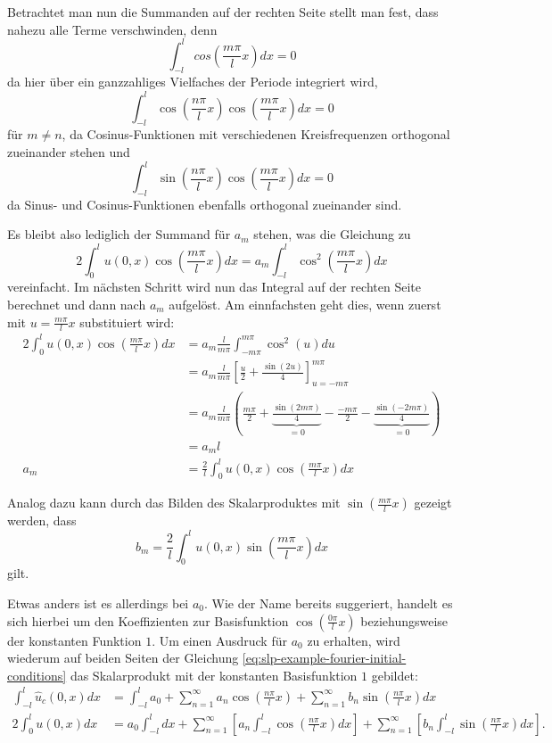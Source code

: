 Betrachtet man nun die Summanden auf der rechten Seite stellt man fest, dass
nahezu alle Terme verschwinden, denn
\[
    \int_{-l}^{l}cos\left(\frac{m \pi}{l}x\right) dx
    =
    0
\]
da hier über ein ganzzahliges Vielfaches der Periode integriert wird,
\[
    \int_{-l}^{l}\cos\left(\frac{n\pi}{l}x\right)
    \cos\left(\frac{m \pi}{l}x\right)dx
    =
    0
\]
für $m\neq n$, da Cosinus-Funktionen mit verschiedenen Kreisfrequenzen
orthogonal zueinander stehen und
\[
    \int_{-l}^{l}\sin\left(\frac{n\pi}{l}x\right)
        \cos\left(\frac{m \pi}{l}x\right)dx
    =
    0
\]
da Sinus- und Cosinus-Funktionen ebenfalls orthogonal zueinander sind.

Es bleibt also lediglich der Summand für $a_m$ stehen, was die Gleichung zu
\[
    2\int_{0}^{l}u(0, x)\cos\left(\frac{m \pi}{l}x\right)dx
    =
    a_m\int_{-l}^{l}\cos^2\left(\frac{m\pi}{l}x\right)dx
\]
vereinfacht. Im nächsten Schritt wird nun das Integral auf der rechten Seite
berechnet und dann nach $a_m$ aufgelöst. Am einnfachsten geht dies, wenn zuerst
mit $u = \frac{m \pi}{l}x$ substituiert wird:
\[
    \begin{aligned}
    2\int_{0}^{l}u(0, x)\cos\left(\frac{m \pi}{l}x\right)dx
    &=
    a_m\frac{l}{m\pi}\int_{-m\pi}^{m\pi}\cos^2\left(u\right)du
    \\
    &=
    a_m\frac{l}{m\pi}\left[\frac{u}{2} + 
    \frac{\sin\left(2u\right)}{4}\right]_{u=-m\pi}^{m\pi}
    \\
    &=
    a_m\frac{l}{m\pi}\left(\frac{m\pi}{2} + 
    \underbrace{\frac{\sin\left(2m\pi\right)}{4}}_{\displaystyle = 0} - 
    \frac{-m\pi}{2} -
    \underbrace{\frac{\sin\left(-2m\pi\right)}{4}}_{\displaystyle = 0}\right)
    \\
    &=
    a_m l
    \\
    a_m
    &=
    \frac{2}{l} \int_{0}^{l}u(0, x)\cos\left(\frac{m \pi}{l}x\right)dx
    \end{aligned}
\]

Analog dazu kann durch das Bilden des Skalarproduktes mit 
$ \sin\left(\frac{m \pi}{l}x\right) $ gezeigt werden, dass
\[
    b_m
    =
    \frac{2}{l} \int_{0}^{l}u(0, x)\sin\left(\frac{m \pi}{l}x\right)dx
\]
gilt.

Etwas anders ist es allerdings bei $a_0$.
Wie der Name bereits suggeriert, handelt es sich hierbei um den Koeffizienten
zur Basisfunktion $ \cos\left(\frac{0 \pi}{l}x\right) $ beziehungsweise der
konstanten Funktion $1$.
Um einen Ausdruck für $ a_0 $ zu erhalten, wird wiederum auf beiden Seiten
der Gleichung \eqref{eq:slp-example-fourier-initial-conditions} das
Skalarprodukt mit der konstanten Basisfunktion $ 1 $ gebildet:
\[
\begin{aligned}
    \int_{-l}^{l}\hat{u}_c(0, x)dx
    &=
    \int_{-l}^{l} a_0
    +
    \sum_{n = 1}^{\infty} a_n\cos\left(\frac{n\pi}{l}x\right)
    +
    \sum_{n = 1}^{\infty} b_n\sin\left(\frac{n\pi}{l}x\right)dx
    \\
    2\int_{0}^{l}u(0, x)dx
    &=
    a_0 \int_{-l}^{l}dx
    +
    \sum_{n = 1}^{\infty}\left[a_n\int_{-l}^{l}\cos\left(\frac{n\pi}{l}x\right)
        dx\right] +
    \sum_{n = 1}^{\infty}\left[b_n\int_{-l}^{l}\sin\left(\frac{n\pi}{l}x\right)
        dx\right].
\end{aligned}
\]

